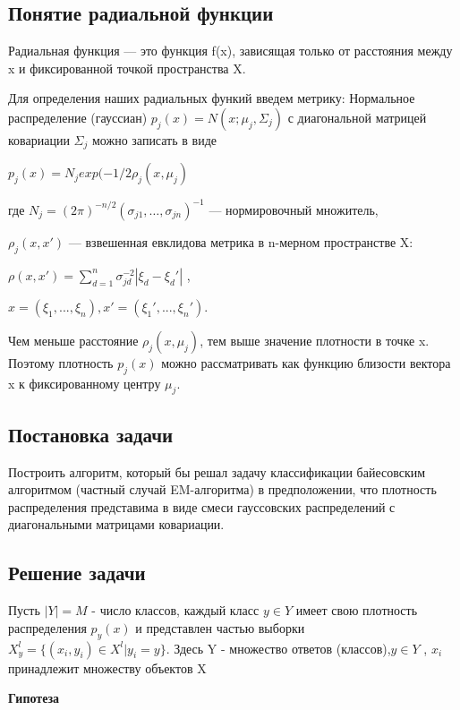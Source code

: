\subsection*{Понятие радиальной функции}

Радиальная функция — это функция f(x), зависящая только от расстояния между x и фиксированной точкой пространства X.

Для определения наших радиальных функий введем метрику:
Нормальное распределение (гауссиан) $p_j(x) = N(x; \mu _j ,\Sigma _j)$ с диагональной матрицей ковариации $\Sigma _j$ можно записать в виде


$p_j(x) = N_j exp(-1/2 \rho  _j (x, \mu _j)$



где $N_j = (2\pi)^ {-n/2}(\sigma _{j1}, \dots ,\sigma _{jn})^{-1}$ — нормировочный множитель,  

$\rho _j(x, x')$ — взвешенная евклидова метрика в n-мерном пространстве X:  

$\rho (x, x') = \sum ^n _{d = 1} \sigma ^{-2} _{jd} |\xi _d - \xi _d '|$ ,  

 $x = (\xi _1, . . . ,\xi _n), x' = (\xi _1 ', . . . , \xi _n').$

Чем меньше расстояние $\rho_j(x, \mu _j)$, тем выше значение плотности в точке x. Поэтому плотность $p _j(x)$ можно рассматривать как функцию близости вектора x к фиксированному центру $\mu_j$.

\subsection*{Постановка задачи}    

Построить алгоритм, который бы решал задачу классификации байесовским алгоритмом (частный случай EM-алгоритма) в предположении, что плотность распределения представима в виде смеси гауссовских распределений с диагональными матрицами ковариации.

\subsection*{Решение задачи}

Пусть  $|Y| = M$ - число классов, каждый класс $y \in Y$ имеет свою плотность распределения $p_y(x)$ и представлен частью выборки $X ^l _y = \{(x_i, y_i) \in X ^l | y_i = y \}.$
Здесь Y - множество ответов (классов),$y \in Y$ , $x_i$ принадлежит множеству объектов X  

\textbf{Гипотеза}

